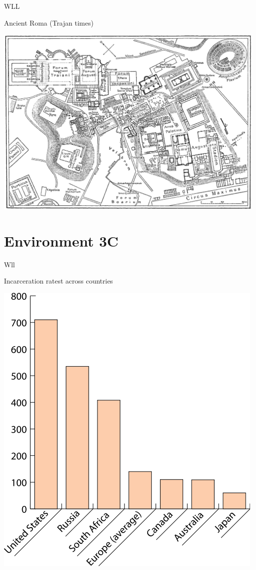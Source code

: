 \begin{map}{W}{LL}
\caption{Ancient Roma  (Trajan times)}
\label{map:roma}
\includegraphics[width=\chartwidth,height=\chartheight]{Rome}
\end{map}
%
%
%
\section{Environment 3C}

\begin{chart}{W}{ll}
\caption{Incarceration ratest across countries}
\label{chart:incarceration}
\includegraphics[width=\chartwidth,height=\chartheight]{incarceration}  
\end{chart}

